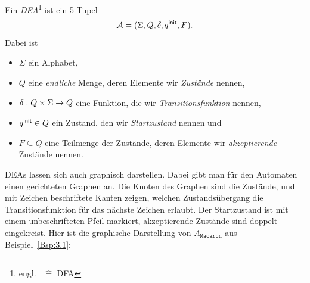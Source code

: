 \begin{Def}
        Ein \emph{\acf{DEA}}\footnote{engl.\  $\hat=$ \acl{DFA}} ist ein 5-Tupel
        \[ \mathcal{A}= (\Sigma, Q,\delta,q^\mathsf{init},F). \]
Dabei ist
        \begin{itemize}
                \item $\Sigma$ ein Alphabet,
                \item $Q$ eine \emph{endliche} Menge, deren Elemente wir \emph{Zustände} nennen,
                \item $\delta:Q\x\Sigma\->Q$ eine Funktion, die wir \emph{Transitionsfunktion} nennen,
                \item $q^\mathsf{init}\in Q$ ein Zustand, den wir \emph{Startzustand} nennen und
                \item $F\subseteq Q$ eine Teilmenge der Zustände, deren Elemente wir \emph{akzeptierende} Zustände nennen.
                \qedhere
        \end{itemize}
\end{Def}

\acs*{DEA}s lassen sich auch graphisch darstellen.
Dabei gibt man für den Automaten einen gerichteten Graphen an.
Die Knoten des Graphen sind die Zustände, und mit Zeichen beschriftete Kanten zeigen, welchen Zustandsübergang die Transitionsfunktion für das nächste Zeichen erlaubt.
Der Startzustand ist mit einem unbeschrifteten Pfeil markiert, akzeptierende Zustände sind doppelt eingekreist.
Hier ist die graphische Darstellung von $A_{\mathtt{Macaron}}$ aus Beispiel~\ref{Bsp:3.1}:

